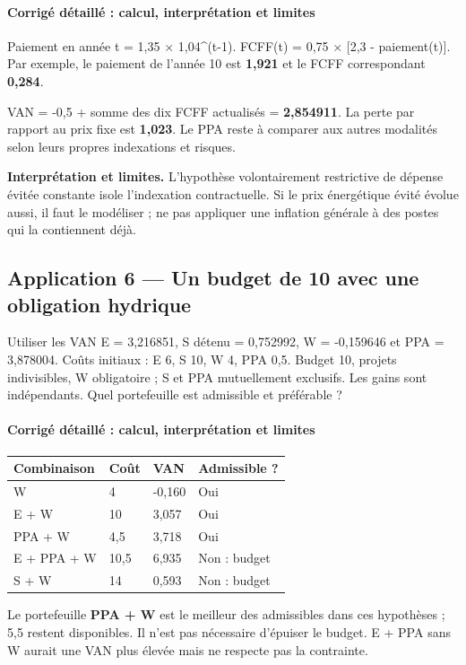 \documentclass[12pt,a4paper]{article}
\begin{document}
\paragraph{Corrigé détaillé : calcul, interprétation et limites}
Paiement en année t = 1,35 $\times$ 1,04\textasciicircum{}(t-1). FCFF(t) = 0,75 $\times$ [2,3 - paiement(t)]. Par exemple, le paiement de l’année 10 est \textbf{1,921} et le FCFF correspondant \textbf{0,284}.

VAN = -0,5 + somme des dix FCFF actualisés = \textbf{2,854911}. La perte par rapport au prix fixe est \textbf{1,023}. Le PPA reste à comparer aux autres modalités selon leurs propres indexations et risques.

\textbf{Interprétation et limites.} L’hypothèse volontairement restrictive de dépense évitée constante isole l’indexation contractuelle. Si le prix énergétique évité évolue aussi, il faut le modéliser ; ne pas appliquer une inflation générale à des postes qui la contiennent déjà.


\subsection*{Application 6 --- Un budget de 10 avec une obligation hydrique}
Utiliser les VAN E = 3,216851, S détenu = 0,752992, W = -0,159646 et PPA = 3,878004. Coûts initiaux : E 6, S 10, W 4, PPA 0,5. Budget 10, projets indivisibles, W obligatoire ; S et PPA mutuellement exclusifs. Les gains sont indépendants. Quel portefeuille est admissible et préférable ?


\paragraph{Corrigé détaillé : calcul, interprétation et limites}

\Needspace{250pt}
\begin{longtable}{p{3.67cm}p{3.67cm}p{3.67cm}p{3.67cm}}
\toprule
Combinaison & Coût & VAN & Admissible ? \\
\midrule\endhead
W & 4 & -0,160 & Oui \\
E + W & 10 & 3,057 & Oui \\
PPA + W & 4,5 & 3,718 & Oui \\
E + PPA + W & 10,5 & 6,935 & Non : budget \\
S + W & 14 & 0,593 & Non : budget \\
\bottomrule
\end{longtable}
Le portefeuille \textbf{PPA + W} est le meilleur des admissibles dans ces hypothèses ; 5,5 restent disponibles. Il n’est pas nécessaire d’épuiser le budget. E + PPA sans W aurait une VAN plus élevée mais ne respecte pas la contrainte.
\end{document}
